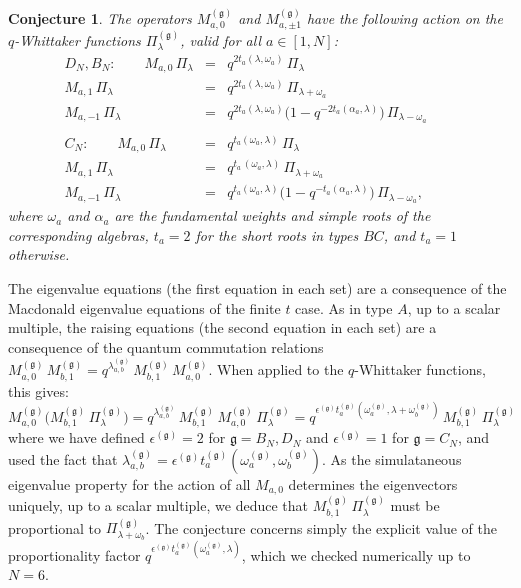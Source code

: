\documentclass[12pt]{amsart}
\newtheorem{conj}[thm]{Conjecture}
\newcommand{\g}{{\mathfrak{g}}}
\newcommand{\al}{{\alpha}}
\numberwithin{equation}{section}
\numberwithin{table}{section}
\begin{document}
\begin{conj}\label{knconj}
The operators $M_{a,0}^{(\g)}$ and $M_{a,\pm 1}^{(\g)}$ have the following action
on the $q$-Whittaker functions $\Pi^{(\g)}_\lambda$, valid for all $a\in [1,N]$:
\begin{eqnarray}
D_N, B_N:\qquad  M_{a,0}\, \Pi_\lambda&=&q^{2t_a (\lambda,\omega_a)}\, \Pi_{\lambda} 
\nonumber\\
M_{a,1}\, \Pi_\lambda&=& q^{2t_a(\lambda,\omega_a)}\, \Pi_{\lambda+\omega_a} \nonumber \\
M_{a,-1}\,  \Pi_\lambda&=&q^{2t_a(\lambda,\omega_a)} \big(1-q^{-2t_a(\al_a,\lambda)}\big)\, \Pi_{\lambda-\omega_a}
 \qquad
\label{DKN}\label{BKN}\\
\nonumber\\
C_N:\qquad  M_{a,0}\, \Pi_\lambda&=&q^{t_a(\omega_a,\lambda)}\,\Pi_\lambda \quad \nonumber\\
M_{a,1}\, \Pi_\lambda &=& q^{t_a\,(\omega_a,\lambda)} \, \Pi_{\lambda+\omega_a}  \quad \nonumber\\
M_{a,-1}\, \Pi_\lambda&=& q^{t_a(\omega_a,\lambda)}\big(1-q^{-t_a(\al_{a},\lambda)}\big) \, \Pi_{\lambda-\omega_a},\quad  \label{CKN}
\end{eqnarray}
where $\omega_a$ and $\al_a$ are the fundamental weights and simple roots of the corresponding algebras,  $t_a=2$ for the short roots in types $BC$, and $t_a=1$ otherwise.
\end{conj}
The eigenvalue equations (the first equation in each set) are a consequence of the Macdonald 
eigenvalue equations of the finite $t$ case. As in type $A$, up to a scalar multiple,
the raising equations (the second equation in each set) are a consequence of the quantum commutation relations
$M_{a,0}^{(\g)}\, M_{b,1}^{(\g)}=q^{\lambda_{a,b}^{(\g)}}  \, M_{b,1}^{(\g)}\, M_{a,0}^{(\g)}$. When applied
to the $q$-Whittaker functions, this gives: 
$$M_{a,0}^{(\g)}\Big( M_{b,1}^{(\g)}\, \Pi_\lambda^{(\g)}\Big)
=q^{\lambda_{a,b}^{(\g)}}\, M_{b,1}^{(\g)}\, M_{a,0}^{(\g)}\,  \Pi_\lambda^{(\g)}=
q^{\epsilon^{(\g)} \!t_a^{(\g)}\!(\omega_a^{(\g)}\!\!\!,\lambda+\omega_b^{(\g)}\!)}\, M_{b,1}^{(\g)}\,  \Pi_\lambda^{(\g)}$$
where we have defined $\epsilon^{(\g)}=2$ for $\g=B_N,D_N$ and $\epsilon^{(\g)}=1$
for $\g=C_N$, and used the fact that $\lambda_{a,b}^{(\g)}=\epsilon^{(\g)}t_a^{(\g)}(\omega_a^{(\g)},\omega_b^{(\g)})$. As the simulataneous eigenvalue property for the action of all $M_{a,0}$ 
determines the eigenvectors uniquely, up to a scalar multiple, we deduce that $M_{b,1}^{(\g)}\, \Pi_\lambda^{(\g)}$ must be proportional
to $\Pi_{\lambda+\omega_b}^{(\g)}$. The conjecture concerns simply the explicit value of the proportionality factor $q^{\epsilon^{(\g)}t_a^{(\g)}(\omega_a^{(\g)}\!\!,\lambda)}$, which we checked numerically up to $N=6$.
\end{document}
